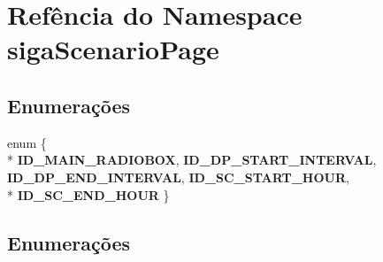 \section{Refência do Namespace siga\+Scenario\+Page}
\label{namespacesiga_scenario_page}
\subsection*{Enumerações}
\begin{DoxyCompactItemize}
\item 
enum \{ \\*
{\bf I\+D\+\_\+\+M\+A\+I\+N\+\_\+\+R\+A\+D\+I\+O\+B\+OX}, 
{\bf I\+D\+\_\+\+D\+P\+\_\+\+S\+T\+A\+R\+T\+\_\+\+I\+N\+T\+E\+R\+V\+AL}, 
{\bf I\+D\+\_\+\+D\+P\+\_\+\+E\+N\+D\+\_\+\+I\+N\+T\+E\+R\+V\+AL}, 
{\bf I\+D\+\_\+\+S\+C\+\_\+\+S\+T\+A\+R\+T\+\_\+\+H\+O\+UR}, 
\\*
{\bf I\+D\+\_\+\+S\+C\+\_\+\+E\+N\+D\+\_\+\+H\+O\+UR}
 \}
\end{DoxyCompactItemize}


\subsection{Enumerações}
